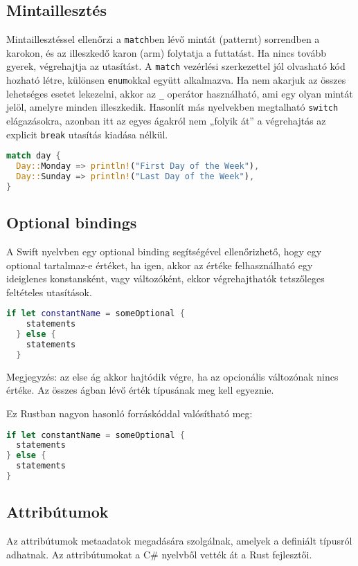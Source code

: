 \subsection{Mintaillesztés}
Mintaillesztéssel ellenőrzi a \lstinline{match}ben lévő mintát (patternt) sorrendben a karokon, és az illeszkedő karon (arm) folytatja a futtatást. Ha nincs tovább gyerek, végrehajtja az utasítást. A \lstinline{match} vezérlési szerkezettel jól olvasható kód hozható létre, különsen \lstinline{enum}okkal együtt alkalmazva. Ha nem akarjuk az összes lehetséges esetet lekezelni, akkor az \lstinline{_} operátor használható, ami egy olyan mintát jelöl, amelyre minden illeszkedik. Hasonlít más nyelvekben megtalható \lstinline{switch} elágazásokra, azonban itt az egyes ágakról nem „folyik át” a végrehajtás az explicit \lstinline{break} utasítás kiadása nélkül.
\begin{lstlisting}[language=Rust, style=boxed]
match day {
  Day::Monday => println!("First Day of the Week"),
  Day::Sunday => println!("Last Day of the Week"),
}
\end{lstlisting}

\subsection{Optional bindings}
A Swift nyelvben egy optional binding segítségével ellenőrizhető, hogy egy optional tartalmaz-e értéket, ha igen, akkor az értéke felhasználható egy ideiglenes konstansként, vagy változóként, ekkor végrehajthatók tetszőleges feltételes utasítások. %
\begin{lstlisting}[language=Swift]
  if let constantName = someOptional {
    statements
  } else {
    statements
  }
\end{lstlisting}
Megjegyzés: az else ág akkor hajtódik végre, ha az opcionális változónak nincs értéke. Az összes ágban lévő érték típusának meg kell egyeznie.

Ez Rustban nagyon hasonló forráskóddal valósítható meg:
\begin{lstlisting}[language=Rust, style=boxed, style=colouredRust]
if let constantName = someOptional {
  statements
} else {
  statements
}
\end{lstlisting}

\subsection{Attribútumok}
Az attribútumok metaadatok megadására szolgálnak, amelyek a definiált típusról adhatnak. Az attribútumokat a C\# nyelvből vették át a Rust fejlesztői.

